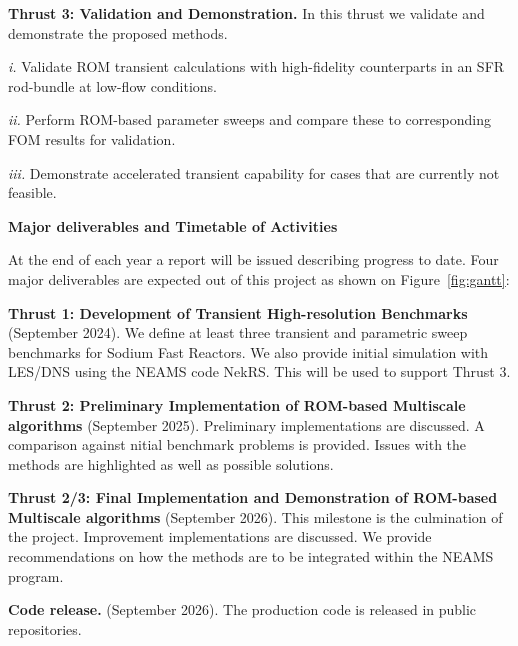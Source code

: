 \textbf{Thrust 3: Validation and Demonstration.} In this thrust we validate and demonstrate the proposed methods.
\\[-4ex]
\begin{description}
\item{\em i.}
Validate ROM transient calculations with high-fidelity counterparts
in an SFR rod-bundle at low-flow conditions.
\item{\em ii.}
Perform ROM-based parameter sweeps and compare these to corresponding
FOM results for validation.
\item{\em iii.}
Demonstrate accelerated transient capability for cases that are currently not
feasible.  \end{description}

\textbf{Major deliverables and Timetable of Activities}

At the end of each year a report will be issued describing progress to date.
Four major deliverables are expected out of this project as shown on
Figure~\ref{fig:gantt}:

\noindent \textbf{Thrust 1: Development of Transient High-resolution
Benchmarks} (September 2024). We define at least three transient and parametric
sweep benchmarks for Sodium Fast Reactors. We also provide initial simulation
with LES/DNS using the NEAMS code NekRS. This will be used to support Thrust 3.

\noindent \textbf{Thrust 2: Preliminary Implementation of ROM-based Multiscale
algorithms} (September 2025). Preliminary implementations are discussed. A
comparison against nitial  benchmark problems is provided. Issues with the
methods are highlighted as well as possible solutions.

\noindent \textbf{Thrust 2/3: Final Implementation and Demonstration of
ROM-based Multiscale algorithms} (September 2026). This milestone is the
culmination of the project. Improvement implementations are discussed. We
provide recommendations on how the methods are to be integrated within the
NEAMS program.

\noindent \textbf{Code release.} (September 2026). The production code is
released in public repositories.

